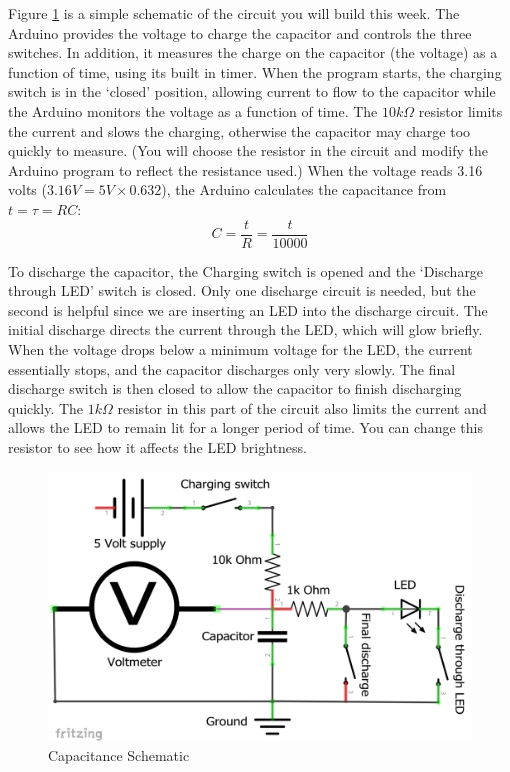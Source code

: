 \documentclass[]{article}
\begin{document}
Figure \ref{cap} is a simple schematic of the circuit you will build this week.  The Arduino provides the voltage to charge the capacitor and controls the three switches.  In addition, it measures the charge on the capacitor (the voltage) as a function of time, using its built in timer.  When the program starts, the charging switch is in the `closed' position, allowing current to flow to the capacitor while the Arduino monitors the voltage as a function of time.  The $10k \Omega$ resistor limits the current and slows the charging, otherwise the capacitor may charge too quickly to measure. (You will choose the resistor in the circuit and modify the Arduino program to reflect the resistance used.) When the voltage reads 3.16 volts ($3.16 V = 5 V \times 0.632$), the Arduino calculates the capacitance from $t=\tau=RC$: 
\begin{equation*}
C=\frac{t}{R}=\frac{t}{10000} 
\end{equation*}

To discharge the capacitor, the Charging switch is opened and the `Discharge through LED' switch is closed.  Only one discharge circuit is needed, but the second is helpful since we are inserting an LED into the  discharge circuit.  The initial discharge directs the current through the LED, which will glow briefly.  When the voltage drops below a minimum voltage for the LED, the current essentially stops, and the capacitor discharges only very slowly.  The final discharge switch is then closed to allow the capacitor to finish discharging quickly.  The $1k \Omega$ resistor in this part of the circuit also limits the current and  allows the LED to remain lit for a longer period of time.  You can change this resistor to see how it affects the LED brightness.



\begin{figure}[h]
	\centering
	\includegraphics[width=12cm]{pics/Schematic.png}
	\caption{Capacitance Schematic}
	\label{cap}
\end{figure}
\end{document}
